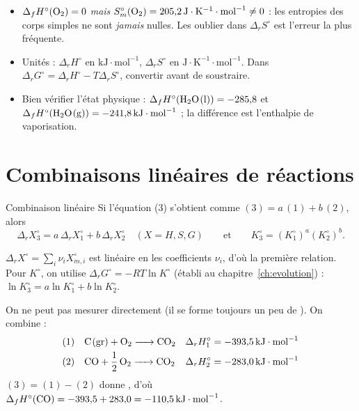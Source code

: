 \begin{pieges}
\begin{itemize}
  \item $\Delta_fH^\circ(\ce{O2}) = 0$ \emph{mais} $S^\circ_m(\ce{O2}) = \SI{205,2}{J.K^{-1}.mol^{-1}} \neq 0$ : les entropies des corps simples ne sont \emph{jamais} nulles. Les oublier dans $\Delta_rS^\circ$ est l'erreur la plus fréquente.
  \item Unités : $\Delta_rH^\circ$ en $\mathrm{kJ\cdot mol^{-1}}$, $\Delta_rS^\circ$ en $\mathrm{J\cdot K^{-1}\cdot mol^{-1}}$. Dans $\Delta_rG^\circ = \Delta_rH^\circ - T\Delta_rS^\circ$, convertir avant de soustraire.
  \item Bien vérifier l'état physique : $\Delta_fH^\circ(\ce{H2O(l)}) = -285{,}8$ et $\Delta_fH^\circ(\ce{H2O(g)}) = \SI{-241,8}{kJ.mol^{-1}}$ ; la différence est l'enthalpie de vaporisation.
\end{itemize}
\end{pieges}

\section{Combinaisons linéaires de réactions}

\begin{resultat}{Combinaison linéaire}
Si l'équation (3) s'obtient comme $(3) = a\,(1) + b\,(2)$, alors
\[ \Delta_rX_3^\circ = a\,\Delta_rX_1^\circ + b\,\Delta_rX_2^\circ \quad (X = H, S, G) \qquad\text{et}\qquad K_3^\circ = \left(K_1^\circ\right)^a\left(K_2^\circ\right)^b. \]
\end{resultat}

\begin{demo}
$\Delta_rX^\circ = \sum_i\nu_iX^\circ_{m,i}$ est linéaire en les coefficients $\nu_i$, d'où la première relation. Pour $K^\circ$, on utilise $\Delta_rG^\circ = -RT\ln K^\circ$ (établi au chapitre~\ref{ch:evolution}) : $\ln K_3^\circ = a\ln K_1^\circ + b\ln K_2^\circ$.
\end{demo}

\begin{exemple}
On ne peut pas mesurer directement  (il se forme toujours un peu de ). On combine :
\begin{align*} (1)&\quad \ce{C(gr) + O2 -> CO2} & \Delta_rH_1^\circ &= \SI{-393,5}{kJ.mol^{-1}}\\ (2)&\quad \ce{CO + 1/2 O2 -> CO2} & \Delta_rH_2^\circ &= \SI{-283,0}{kJ.mol^{-1}} \end{align*}
$(3) = (1) - (2)$ donne , d'où $\Delta_fH^\circ(\ce{CO}) = -393{,}5 + 283{,}0 = \SI{-110,5}{kJ.mol^{-1}}$.
\end{exemple}

